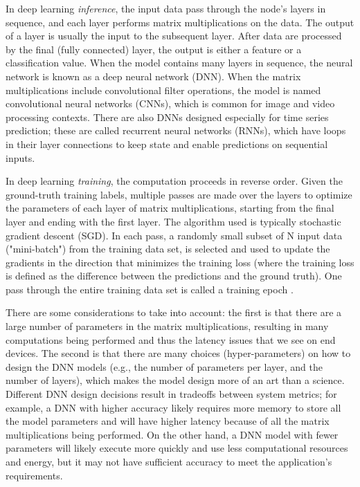 In deep learning \textit{inference}, the input data pass through the node's layers in sequence, and each layer performs matrix multiplications on the data. The output of a layer is usually the input to the subsequent layer. After data are processed by the final (fully connected) layer, the output is either a feature or a classification value. When the model contains many layers in sequence, the neural network is known as a deep neural network (DNN). When the matrix multiplications include convolutional filter operations, the model is named convolutional neural networks (CNNs), which is common for image and video processing contexts. There are also DNNs designed especially for time series prediction; these are called recurrent neural networks (RNNs), which have loops in their layer connections to keep state and enable predictions on sequential inputs.

In deep learning \textit{training}, the computation proceeds in reverse order. Given the ground-truth training labels, multiple passes are made over the layers to optimize the parameters of each layer of matrix multiplications, starting from the final layer and ending with the first layer. The algorithm used is typically stochastic gradient descent (SGD).  In each pass, a randomly small subset of N input data ("mini-batch") from the training data set, is selected and used to update the gradients in the direction that minimizes the training loss (where the training loss is defined as the difference between the predictions and the ground truth). One pass through the entire training data set is called a training epoch \cite{ruder2016overview}.

There are some considerations to take into account: the first is that there are a large number of parameters in the matrix multiplications, resulting in many computations being performed and thus the latency issues that we see on end devices. The second is that there are many choices (hyper-parameters) on how to design the DNN models (e.g., the number of parameters per layer, and the number of layers), which makes the model design more of an art than a science. Different DNN design decisions result in tradeoffs between system metrics; for example, a DNN with higher accuracy likely requires more memory to store all the model parameters and will have higher latency because of all the matrix multiplications being performed. On the other hand, a DNN model with fewer parameters will likely execute more quickly and use less computational resources and energy, but it may not have sufficient accuracy to meet the application's requirements.


